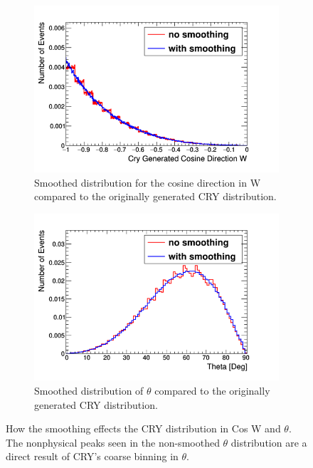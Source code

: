 \begin{figure}[htbp]
\centering
\begin{subfigure}{.5\textwidth}
  \centering
  \includegraphics[width=\linewidth]{Chapter4/Figs/Raster/CryPlots/CrySmoothingCosine.png}
  \captionsetup{width=.9\linewidth}
  \caption{Smoothed distribution for the cosine direction in W compared to the originally generated CRY distribution.}
  \label{subFig:CrySmoothingCosine}
\end{subfigure}%
\begin{subfigure}{.5\textwidth}
  \centering
  \includegraphics[width=\linewidth]{Chapter4/Figs/Raster/CryPlots/CrySmoothingTheta.png}
  \captionsetup{width=.9\linewidth}
  \caption{Smoothed distribution of $\theta$ compared to the originally generated CRY distribution.}
  \label{subFig:CrySmoothingTheta}
\end{subfigure}
\caption{How the smoothing effects the CRY distribution in Cos W and $\theta$. The nonphysical peaks seen in the non-smoothed $\theta$ distribution are a direct result of CRY's coarse binning in $\theta$.}
\label{fig:CrySmoothingCosTheta}
\end{figure}

